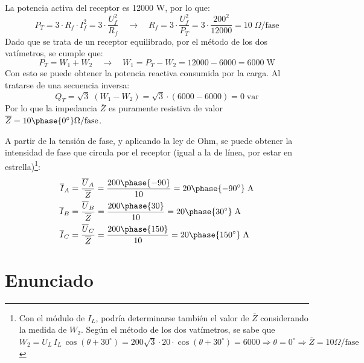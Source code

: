 La potencia activa del receptor es 12000 W, por lo que:
\begin{equation*}
    P_T=3\cdot R_f\cdot I_f^2=3\cdot \dfrac{U_f^2}{R_f} \quad\rightarrow\quad R_f=3\cdot\dfrac{U_f^2}{P_T}=3\cdot \dfrac{200^2}{12000}=10\;\Omega\text{/fase}
\end{equation*}
Dado que se trata de un receptor equilibrado, por el método de los dos vatímetros, se cumple que:
\begin{equation*}
    P_T=W_1+W_2 \quad\rightarrow\quad W_1=P_T-W_2=12000-6000=6000\;\text{W}
\end{equation*}
Con esto se puede obtener la potencia reactiva consumida por la carga. Al tratarse de una secuencia inversa:
\begin{equation*}
    Q_T=\sqrt{3}\; (W_1-W_2)=\sqrt{3}\cdot (6000-6000)=0\;\text{var}
\end{equation*}
Por lo que la impedancia $\overline{Z}$ es puramente resistiva de valor $\overline{Z}={10\phase{0^\circ}}\Omega/\mathrm{fase}$.

\vspace{3mm}
A partir de la tensión de fase, y aplicando la ley de Ohm, se puede obtener la intensidad de fase que circula por el receptor (igual a la de línea, por estar en estrella)\footnote{Con el módulo de $I_L$, podría determinarse también el valor de $\overline{Z}$ considerando la medida de $W_2$. Según el método de los dos vatímetros, se sabe que $W_2=U_L\,I_L\,\cos(\theta+30^\circ)=200\sqrt{3}\cdot 20\cdot \cos(\theta+30^\circ)=6000\Rightarrow \theta = 0^\circ\Rightarrow\overline{Z}=10\Omega/\mathrm{fase}$}:
\begin{align*}
    \overline{I}_A&=\dfrac{\overline{U}_{A}}{\overline{Z}}=\dfrac{200\phase{-90}}{10}={20\phase{-90^\circ}\;\text{A}}\\
    \overline{I}_B&=\dfrac{\overline{U}_{B}}{\overline{Z}}=\dfrac{200\phase{30}}{10}={20\phase{30^\circ}\;\text{A}}\\
    \overline{I}_C&=\dfrac{\overline{U}_{C}}{\overline{Z}}=\dfrac{200\phase{150}}{10}={20\phase{150^\circ}\;\text{A}}
\end{align*}




 \section{Enunciado}
 

